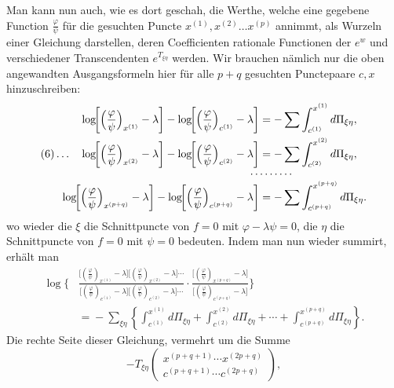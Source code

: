 \documentclass[10pt]{article}
\begin{document}
Man kann nun auch, wie es dort geschah, die Werthe, welche eine gegebene Function \(\frac{\varphi}{\psi}\) für die gesuchten Puncte \(x^{(1)},x^{(2)}\ldots x^{(p)}\) annimmt, als Wurzeln einer Gleichung darstellen, deren Coefficienten rationale Functionen der \(e^w\) und verschiedener Transcendenten \(e^{T_{\xi\eta}}\) werden. Wir brauchen nämlich nur die oben angewandten Ausgangsformeln hier für alle \(p+q\) gesuchten Punctepaare \(c,x\) hinzuschreiben:
\begingroup\footnotesize
\[
\begin{aligned}
\log\!\biggl[\Bigl(\frac{\varphi}{\psi}\Bigr)_{x^{(1)}}-\lambda\biggr]
-\log\!\biggl[\Bigl(\frac{\varphi}{\psi}\Bigr)_{c^{(1)}}-\lambda\biggr]
&=-\sum\int_{c^{(1)}}^{x^{(1)}}d\Pi_{\xi\eta},\\
(6)\ldots\quad
\log\!\biggl[\Bigl(\frac{\varphi}{\psi}\Bigr)_{x^{(2)}}-\lambda\biggr]
-\log\!\biggl[\Bigl(\frac{\varphi}{\psi}\Bigr)_{c^{(2)}}-\lambda\biggr]
&=-\sum\int_{c^{(2)}}^{x^{(2)}}d\Pi_{\xi\eta},\\[-0.4em]
&\hspace{-1.0em}\cdots\cdots\cdots\\[-0.4em]
\log\!\biggl[\Bigl(\frac{\varphi}{\psi}\Bigr)_{x^{(p+q)}}-\lambda\biggr]
-\log\!\biggl[\Bigl(\frac{\varphi}{\psi}\Bigr)_{c^{(p+q)}}-\lambda\biggr]
&=-\sum\int_{c^{(p+q)}}^{x^{(p+q)}}d\Pi_{\xi\eta}.
\end{aligned}
\]
\endgroup
wo wieder die \(\xi\) die Schnittpuncte von \(f=0\) mit \(\varphi-\lambda\psi=0\), die \(\eta\) die Schnittpuncte von \(f=0\) mit \(\psi=0\) bedeuten. Indem man nun wieder summirt, erhält man
\begingroup\footnotesize
\[
\begin{aligned}
\log\Biggl\{&
\frac{\bigl[(\frac{\varphi}{\psi})_{x^{(1)}}-\lambda\bigr]
\bigl[(\frac{\varphi}{\psi})_{x^{(2)}}-\lambda\bigr]\cdots}
{\bigl[(\frac{\varphi}{\psi})_{c^{(1)}}-\lambda\bigr]
\bigl[(\frac{\varphi}{\psi})_{c^{(2)}}-\lambda\bigr]\cdots}
\cdot
\frac{\bigl[(\frac{\varphi}{\psi})_{x^{(p+q)}}-\lambda\bigr]}
{\bigl[(\frac{\varphi}{\psi})_{c^{(p+q)}}-\lambda\bigr]}
\Biggr\}\\
&={} -\sum_{\xi\eta}\left\{\int_{c^{(1)}}^{x^{(1)}}d\Pi_{\xi\eta}+
\int_{c^{(2)}}^{x^{(2)}}d\Pi_{\xi\eta}+\cdots+
\int_{c^{(p+q)}}^{x^{(p+q)}}d\Pi_{\xi\eta}\right\}.
\end{aligned}
\]
\endgroup
Die rechte Seite dieser Gleichung, vermehrt um die Summe
\[
-T_{\xi\eta}\begin{pmatrix}x^{(p+q+1)}\cdots x^{(2p+q)}\\c^{(p+q+1)}\cdots c^{(2p+q)}\end{pmatrix},
\]
\end{document}
